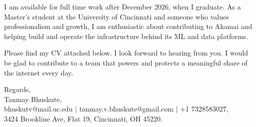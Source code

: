 \documentclass[11pt]{letter}
\begin{document}
\begin{letter}{}
I am available for full time work after December 2026, when I graduate. As a Master's student at the University of Cincinnati and someone who values professionalism and growth, I am enthusiastic about contributing to Akamai and helping build and operate the infrastructure behind its ML and data platforms.

Please find my CV attached below. I look forward to hearing from you. I would be glad to contribute to a team that powers and protects a meaningful share of the internet every day.

{\setlength{\parskip}{0pt}
Regards,\\
Tanmay Bhuskute,\\
bhuskutv@mail.uc.edu $\mid$ tanmay.v.bhuskute@gmail.com $\mid$ +1 7328583027,\\
3424 Brookline Ave, Flat 19, Cincinnati, OH 45220.
}

\end{letter}
\end{document}
